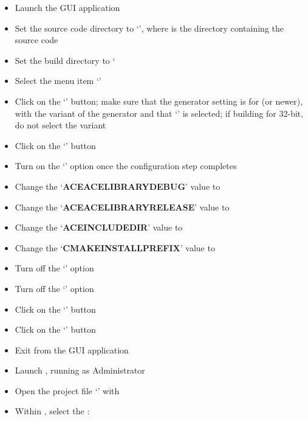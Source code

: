 \begin{itemize}
\item Launch the  GUI application
\item\exSp{}Set the source code directory to `',
where  is the directory containing the \mplusm{} source code
\item\exSp{}Set the build directory to `
\item\exSp{}Select the menu item `'
\item\exSp{}Click on the `' button; make sure that the generator
setting is for  (or newer), with the  variant of
the generator and that `' is selected; if building
for 32-bit, do not select the  variant
\item\exSp{}Click on the `' button
\item\exSp{}Turn on the `' option once the configuration step completes
\item\exSp{}Change the `\textbf{ACE\fUS{}ACE\fUS{}LIBRARY\fUS{}DEBUG}' value to
\item\exSp{}Change the `\textbf{ACE\fUS{}ACE\fUS{}LIBRARY\fUS{}RELEASE}' value to
\item\exSp{}Change the `\textbf{ACE\fUS{}INCLUDE\fUS{}DIR}' value to
\item\exSp{}Change the `\textbf{CMAKE\fUS{}INSTALL\fUS{}PREFIX}' value to
\item\exSp{}Turn off the `' option
\item\exSp{}Turn off the `' option
\item\exSp{}Click on the `' button
\item\exSp{}Click on the `' button
\item\exSp{}Exit from the  GUI application
\item\exSp{}Launch , running as Administrator
\item\exSp{}Open the project file
`' with
\item\exSp{}Within , select the  :\ 

\end{itemize}
